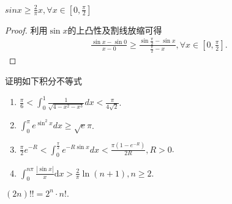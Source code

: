 \documentclass[../../main.tex]{subfiles}
\begin{document}
\begin{theorem}[Jordan不等式]\label{theorem:Jordan不等式}
$sinx\geqslant \frac{2}{\pi}x,\forall x\in [0,\frac{\pi}{2}]$
\end{theorem}
\begin{proof}
利用$\sin x$的上凸性及割线放缩可得
\begin{align*}
\frac{\sin x-\sin 0}{x-0}\geqslant \frac{\sin \frac{\pi}{2}-\sin x}{\frac{\pi}{2}-x},\forall x\in \left[ 0,\frac{\pi}{2} \right] .
\end{align*}
\end{proof}

\begin{example}
证明如下积分不等式
\begin{enumerate}
\item \(\frac{\pi}{6} < \int_{0}^{1}\frac{1}{\sqrt{4 - x^{2}-x^{3}}}dx < \frac{\pi}{4\sqrt{2}}\).

\item \(\int_{0}^{\pi}e^{\sin^{2}x}dx \geqslant \sqrt{e}\pi\).

\item \(\frac{\pi}{2}e^{-R} < \int_{0}^{\frac{\pi}{2}}e^{-R\sin x}dx < \frac{\pi(1 - e^{-R})}{2R}, R > 0\).

\item $\int_0^{n\pi}{\frac{\left| \sin x \right|}{x}\mathrm{d}x}>\frac{2}{\pi}\ln \left( n+1 \right) ,n\geqslant 2.$
\end{enumerate}
\end{example}
\begin{remark}
$(2n)!!=2^n\cdot n!.$
\end{remark}
\end{document}

